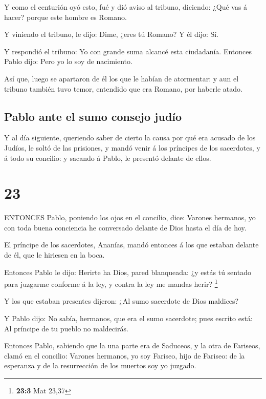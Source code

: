  Y como el centurión oyó esto, fué y dió aviso al tribuno,
diciendo: ¿Qué vas á hacer? porque este hombre es Romano.

 Y viniendo el tribuno, le dijo: Dime, ¿eres tú Romano? Y
él dijo: Sí.

 Y respondió el tribuno: Yo con grande suma alcancé esta
ciudadanía. Entonces Pablo dijo: Pero yo lo soy de nacimiento.

 Así que, luego se apartaron de él los que le habían de
atormentar: y aun el tribuno también tuvo temor, entendido que era
Romano, por haberle atado.

\hypertarget{pablo-ante-el-sumo-consejo-juduxedo}{%
\subsection{Pablo ante el sumo consejo
judío}\label{pablo-ante-el-sumo-consejo-juduxedo}}

 Y al día siguiente, queriendo saber de cierto la causa por
qué era acusado de los Judíos, le soltó de las prisiones, y mandó venir
á los príncipes de los sacerdotes, y á todo su concilio: y sacando á
Pablo, le presentó delante de ellos.

\hypertarget{section-22}{%
\section{23}\label{section-22}}

 ENTONCES Pablo, poniendo los ojos en el concilio, dice:
Varones hermanos, yo con toda buena conciencia he conversado delante de
Dios hasta el día de hoy.

 El príncipe de los sacerdotes, Ananías, mandó entonces á
los que estaban delante de él, que le hiriesen en la boca.

 Entonces Pablo le dijo: Herirte ha Dios, pared blanqueada:
¿y estás tú sentado para juzgarme conforme á la ley, y contra la ley me
mandas herir? \footnote{\textbf{23:3} Mat 23,37}

 Y los que estaban presentes dijeron: ¿Al sumo sacerdote de
Dios maldices?

 Y Pablo dijo: No sabía, hermanos, que era el sumo
sacerdote; pues escrito está: Al príncipe de tu pueblo no maldecirás.

 Entonces Pablo, sabiendo que la una parte era de Saduceos,
y la otra de Fariseos, clamó en el concilio: Varones hermanos, yo soy
Fariseo, hijo de Fariseo: de la esperanza y de la resurrección de los
muertos soy yo juzgado.

